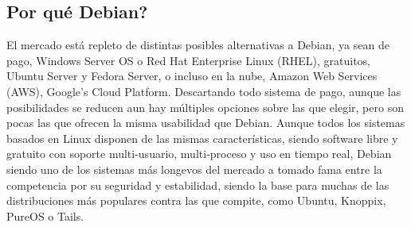 \subsection{Por qué Debian?}
El mercado está repleto de distintas posibles alternativas a Debian, ya sean de pago, Windows Server OS o Red Hat Enterprise Linux (RHEL), gratuitos, Ubuntu Server y Fedora Server, o incluso en la nube, Amazon Web Services (AWS), Google’s Cloud Platform.
\newline
\newline
Descartando todo sistema de pago, aunque las posibilidades se reducen aun hay múltiples opciones sobre las que elegir, pero son pocas las que ofrecen la misma usabilidad que Debian.
\newline
\newline
Aunque todos los sistemas basados en Linux disponen de las mismas características, siendo software libre y gratuito con soporte multi-usuario, multi-proceso y uso en tiempo real, Debian siendo uno de los sistemas más longevos del mercado a tomado fama entre la competencia por su seguridad y estabilidad, siendo la base para muchas de las distribuciones más populares contra las que compite, como Ubuntu, Knoppix, PureOS o Tails. 
